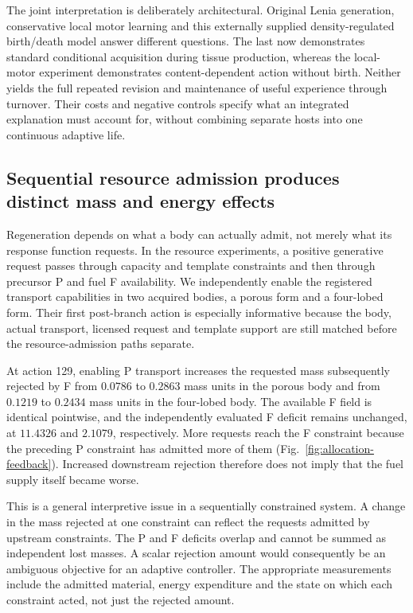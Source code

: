 The joint interpretation is deliberately architectural. Original Lenia generation, conservative local motor learning and this externally supplied density-regulated birth/death model answer different questions. The last now demonstrates standard conditional acquisition during tissue production, whereas the local-motor experiment demonstrates content-dependent action without birth. Neither yields the full repeated revision and maintenance of useful experience through turnover. Their costs and negative controls specify what an integrated explanation must account for, without combining separate hosts into one continuous adaptive life.






\subsection*{Sequential resource admission produces distinct mass and energy effects}

Regeneration depends on what a body can actually admit, not merely what its response function requests. In the resource experiments, a positive generative request passes through capacity and template constraints and then through precursor P and fuel F availability. We independently enable the registered transport capabilities in two acquired bodies, a porous form and a four-lobed form. Their first post-branch action is especially informative because the body, actual transport, licensed request and template support are still matched before the resource-admission paths separate.

At action 129, enabling P transport increases the requested mass subsequently rejected by F from $0.0786$ to $0.2863$ mass units in the porous body and from $0.1219$ to $0.2434$ mass units in the four-lobed body. The available F field is identical pointwise, and the independently evaluated F deficit remains unchanged, at $11.4326$ and $2.1079$, respectively. More requests reach the F constraint because the preceding P constraint has admitted more of them (Fig.~\ref{fig:allocation-feedback}). Increased downstream rejection therefore does not imply that the fuel supply itself became worse.

This is a general interpretive issue in a sequentially constrained system. A change in the mass rejected at one constraint can reflect the requests admitted by upstream constraints. The P and F deficits overlap and cannot be summed as independent lost masses. A scalar rejection amount would consequently be an ambiguous objective for an adaptive controller. The appropriate measurements include the admitted material, energy expenditure and the state on which each constraint acted, not just the rejected amount.


